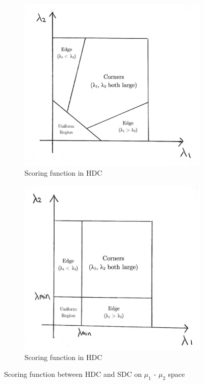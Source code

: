 \documentclass[a4paper, 12pt]{article}
\begin{document}
\begin{figure}[H]
    \centering
    \begin{subfigure}{0.4\textwidth}
        \centering
        \includegraphics[width=\textwidth]{HDC R Scoring.png}
        \caption{Scoring function in HDC}
        \label{figure 4.a}
    \end{subfigure}
    \begin{subfigure}{0.4\textwidth}
        \centering
        \includegraphics[width=\textwidth]{SDC R scoring.png}
        \caption{Scoring function in HDC}
        \label{figure 4.a}
    \end{subfigure}
    \caption{Scoring function between HDC and SDC on $\mu_1$ - $\mu_2$ space}
    \label{Figure 10}
\end{figure}
\end{document}
